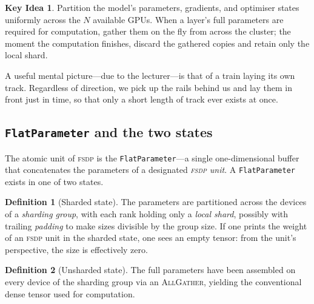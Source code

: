 \documentclass[11pt,a4paper]{article}
\theoremstyle{definition}
\newtheorem{definition}{Definition}[section]
\newtheorem*{keyidea}{Key Idea}
\theoremstyle{remark}
\newcommand{\FSDP}{\textsc{fsdp}}
\newcommand{\AllGather}{\textsc{AllGather}}
\begin{document}
\begin{keyidea}
Partition the model's parameters, gradients, and optimiser states uniformly across the $N$ available GPUs. When a layer's full parameters are required for computation, gather them on the fly from across the cluster; the moment the computation finishes, discard the gathered copies and retain only the local shard.
\end{keyidea}

A useful mental picture---due to the lecturer---is that of a train laying its own track. Regardless of direction, we pick up the rails behind us and lay them in front just in time, so that only a short length of track ever exists at once.

\subsection{\texttt{FlatParameter} and the two states}

The atomic unit of \FSDP{} is the \texttt{FlatParameter}---a single one-dimensional buffer that concatenates the parameters of a designated \emph{\FSDP{} unit}. A \texttt{FlatParameter} exists in one of two states.

\begin{definition}[Sharded state]
The parameters are partitioned across the devices of a \emph{sharding group}, with each rank holding only a \emph{local shard}, possibly with trailing \emph{padding} to make sizes divisible by the group size. If one prints the weight of an \FSDP{} unit in the sharded state, one sees an empty tensor: from the unit's perspective, the size is effectively zero.
\end{definition}

\begin{definition}[Unsharded state]
The full parameters have been assembled on every device of the sharding group via an \AllGather{}, yielding the conventional dense tensor used for computation.
\end{definition}
\end{document}
